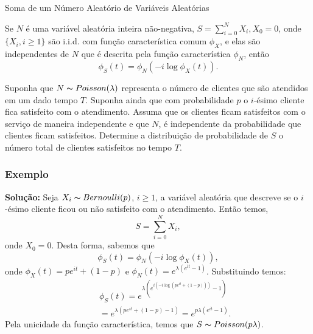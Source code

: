 \begin{frame}{Soma de um Número Aleatório de Variáveis Aleatórias}


\begin{teo} Se $N$ é uma variável aleatória inteira não-negativa,
$S=\sum_{i=0}^{N}X_i,X_0=0$, onde $\{X_i,i\geq 1\}$ são i.i.d. com
função característica comum $\phi_X$, e elas são independentes de
$N$ que é descrita pela função característica $\phi_N$, então
$$\phi_S(t)=\phi_N(-i\log\phi_X(t)).$$ \end{teo}


\begin{exem}
Suponha que $N\thicksim Poisson(\lambda)$ representa o número de
clientes que são atendidos em um dado tempo $T$. Suponha ainda que
com probabilidade $p$ o $i$-ésimo cliente fica satisfeito com o atendimento.
Assuma que os clientes ficam satisfeitos com o serviço de maneira
independente e que $N$, é independente da probabilidade que clientes
ficam satisfeitos. Determine a distribuição de probabilidade de $S$
o número total de clientes satisfeitos no tempo $T$.

\end{exem}
\end{frame}


\begin{frame}
\frametitle{\textbf{Exemplo}}
\baselineskip=13pt
\begin{block}{}

{\bf Solução:} Seja $X_i\thicksim Bernoulli(p)$, $i\geq 1$, a
variável aleatória que descreve se o $i$-ésimo cliente ficou ou não
satisfeito com o atendimento. Então temos,
$$S=\sum_{i=0}^{N}X_i,$$
onde $X_0=0$. Desta forma, sabemos que
$$\phi_S(t)=\phi_N(-i\log\phi_X(t)),$$
onde $\phi_X(t)=pe^{it}+(1-p)$ e $\phi_N(t)=e^{\lambda(e^{it}-1)}$.
Substituindo temos:
\begin{eqnarray}
& & \phi_S(t)=e^{\lambda(e^{i(-i\log(pe^{it}+(1-p)))}-1)}\nonumber \\ & & =e^{\lambda(pe^{it}+(1-p)-1)}=e^{p\lambda(e^{it}-1)}.\nonumber
\end{eqnarray}
Pela unicidade da função característica, temos que $S\thicksim
Poisson(p\lambda)$.

\end{block}
\end{frame}


